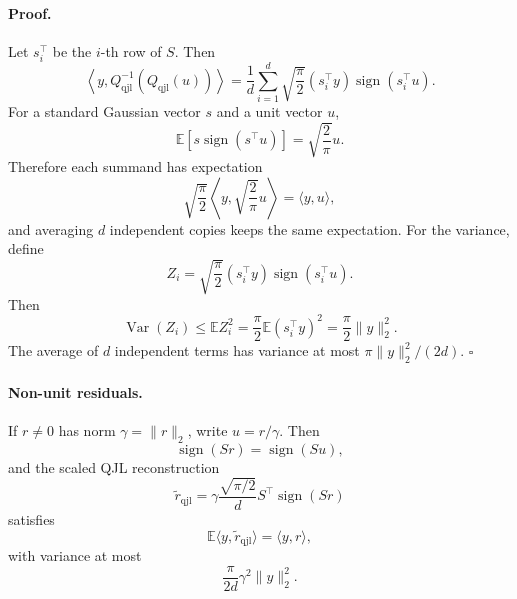 \paragraph{Proof.}
Let $s_i^\top$ be the $i$-th row of $S$.
Then
\begin{equation}
    \left\langle y,Q_{\mathrm{qjl}}^{-1}(Q_{\mathrm{qjl}}(u))\right\rangle
    =\frac1d\sum_{i=1}^{d}\sqrt{\frac\pi2}
    (s_i^\top y)\operatorname{sign}(s_i^\top u).
\end{equation}
For a standard Gaussian vector $s$ and a unit vector $u$,
\begin{equation}
    \mathbb E[s\operatorname{sign}(s^\top u)]
    =\sqrt{\frac2\pi}u.
\end{equation}
Therefore each summand has expectation
\begin{equation}
    \sqrt{\frac\pi2}\left\langle y,\sqrt{\frac2\pi}u\right\rangle
    =\langle y,u\rangle,
\end{equation}
and averaging $d$ independent copies keeps the same expectation.
For the variance, define
\begin{equation}
    Z_i=\sqrt{\frac\pi2}(s_i^\top y)\operatorname{sign}(s_i^\top u).
\end{equation}
Then
\begin{equation}
    \operatorname{Var}(Z_i)
    \le \mathbb E Z_i^2
    =\frac\pi2\mathbb E(s_i^\top y)^2
    =\frac\pi2\|y\|_2^2.
\end{equation}
The average of $d$ independent terms has variance at most $\pi\|y\|_2^2/(2d)$.
\hfill$\square$

\paragraph{Non-unit residuals.}
If $r\ne 0$ has norm $\gamma=\|r\|_2$, write $u=r/\gamma$.
Then
\begin{equation}
    \operatorname{sign}(Sr)=\operatorname{sign}(Su),
\end{equation}
and the scaled QJL reconstruction
\begin{equation}
    \widetilde r_{\mathrm{qjl}}
    =\gamma\frac{\sqrt{\pi/2}}{d}S^\top\operatorname{sign}(Sr)
\end{equation}
satisfies
\begin{equation}
    \mathbb E\langle y,\widetilde r_{\mathrm{qjl}}\rangle
    =\langle y,r\rangle,
\end{equation}
with variance at most
\begin{equation}
    \frac{\pi}{2d}\gamma^2\|y\|_2^2.
\end{equation}

